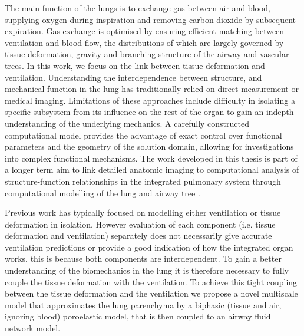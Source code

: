 
The main function of the lungs is to exchange gas between air and blood, supplying oxygen during inspiration and removing carbon dioxide by subsequent expiration. Gas exchange is optimised by ensuring efficient matching between ventilation and blood flow, the distributions of which are largely governed by tissue deformation, gravity and branching structure of the airway and vascular trees. In this work, we focus on the link between tissue deformation and ventilation. Understanding the interdependence between structure, and mechanical function in the lung has traditionally relied on direct measurement or medical imaging. Limitations of these approaches include difficulty in isolating a specific subsystem from its influence on the rest of the organ to gain an indepth understanding of the underlying mechanics. A carefully constructed computational model provides the advantage of exact control over functional parameters and the geometry of the solution domain, allowing for investigations into complex functional mechanisms. The work developed in this thesis is part of a longer term aim to link detailed anatomic imaging to computational analysis of structure-function relationships in the integrated pulmonary system through computational modelling of the lung and airway tree \citep{tawhai2006imaging}. 

Previous work has typically focused on modelling either ventilation or tissue deformation in isolation. However evaluation of each component (i.e. tissue deformation and ventilation) separately does not necessarily give accurate ventilation predictions or provide a good indication of how the integrated organ works, this is because both components are interdependent. To gain a better understanding of the biomechanics in the lung it is therefore necessary to fully couple the tissue deformation with the ventilation. To achieve this tight coupling between the tissue deformation and the ventilation we propose a novel multiscale model that approximates the lung parenchyma by a biphasic (tissue and air, ignoring blood) poroelastic model, that is then coupled to an airway fluid network model. 

